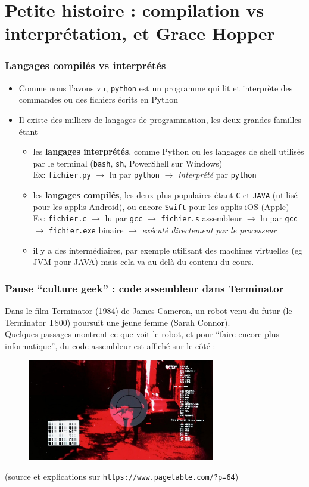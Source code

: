\documentclass{beamer}
\newcommand{\mypause}{\pause}
\newcommand{\pyth}{{\sc Python}}
\newcommand{\prog}[1]{\alert{\texttt{#1}}}
\begin{document}
\section{Petite histoire : compilation vs interprétation, et Grace Hopper}
\frame
{
\frametitle{Langages compilés vs interprétés}
\begin{itemize}
  \item Comme nous l'avons vu, \prog{python} est un \alert{programme} qui lit et \alert{interprète} des commandes ou des fichiers écrits en \pyth{} \mypause{}
  \item Il existe des milliers de langages de programmation, les deux grandes familles étant \mypause{}
  \begin{itemize}
    \item les \textbf{langages interprétés}, comme Python ou les langages de shell utilisés par le terminal (\prog{bash}, \prog{sh}, PowerShell sur Windows) \mypause{}\\
      Ex: \prog{fichier.py} $\rightarrow$ lu par \prog{python} $\rightarrow$ \emph{interprété} par \prog{python} \mypause{}
    \item les \textbf{langages compilés}, les deux plus populaires étant \prog{C} et \prog{JAVA} (utilisé pour les applis Android), ou encore \prog{Swift} pour les applis iOS (Apple) \mypause{}\\
      Ex: \prog{fichier.c} $\rightarrow$ lu par \prog{gcc} $\rightarrow$ \prog{fichier.s} assembleur $\rightarrow$ lu par \prog{gcc} $\rightarrow$ \prog{fichier.exe} binaire $\rightarrow$ \emph{exécuté directement par le processeur} \mypause{}
      \item il y a des intermédiaires, par exemple utilisant des machines virtuelles (eg JVM pour JAVA) mais cela va au delà du contenu du cours.
    \end{itemize}
\end{itemize}
}

\frame
{
\frametitle{Pause ``culture geek'' : code assembleur dans Terminator}
{
  \footnotesize
  Dans le film Terminator (1984) de James Cameron, un robot venu du futur (le Terminator T800) poursuit une jeune femme (Sarah Connor).\\
  Quelques passages montrent ce que voit le robot, et pour ``faire encore plus informatique'', du code assembleur est affiché sur le côté :

  \begin{figure}
    \center
    \includegraphics[height=125pt]{00-37-19.jpg}
  \end{figure}
  (source et explications sur \prog{https://www.pagetable.com/?p=64})
}
}
\end{document}
